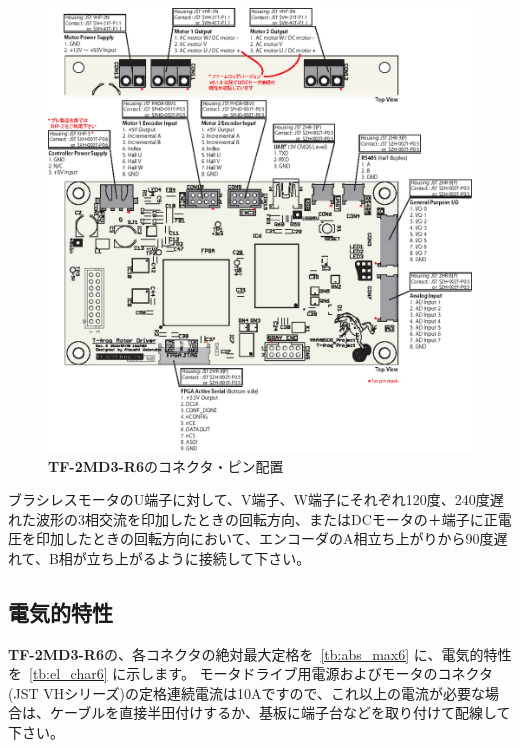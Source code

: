\documentclass[11pt,a4j,openany,fleqn]{jbook}
\begin{document}
\begin{figure}[H]
\centering\includegraphics[width=160mm]{pin-description-r6.eps}
\caption{{\bf TF-2MD3-R6}のコネクタ・ピン配置}
\label{fig:connector6}
\end{figure}

ブラシレスモータのU端子に対して、V端子、W端子にそれぞれ120度、240度遅れた波形の3相交流を印加したときの回転方向、またはDCモータの＋端子に正電圧を印加したときの回転方向において、エンコーダのA相立ち上がりから90度遅れて、B相が立ち上がるように接続して下さい。
\par


\subsection{電気的特性}
\label{sec:電気的特性}

{\bf TF-2MD3-R6}の、各コネクタの絶対最大定格を\tablename~\ref{tb:abs_max6} に、電気的特性を\tablename~\ref{tb:el_char6} に示します。
モータドライブ用電源およびモータのコネクタ(JST VHシリーズ)の定格連続電流は10Aですので、これ以上の電流が必要な場合は、ケーブルを直接半田付けするか、基板に端子台などを取り付けて配線して下さい。\par
\end{document}

